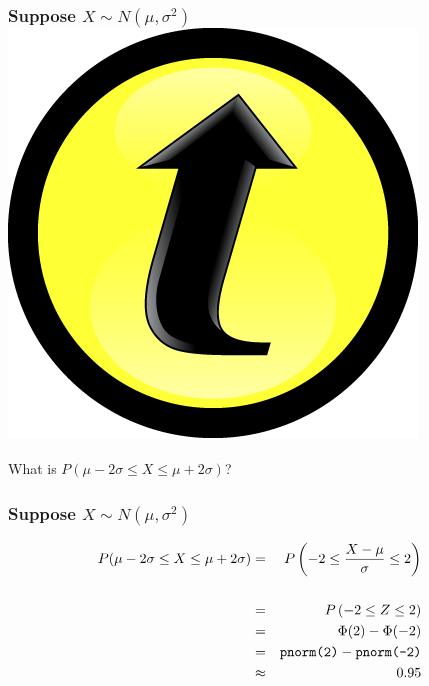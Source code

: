\documentclass[handout]{beamer}
\begin{document}

\begin{frame}
\frametitle{Suppose $X \sim N(\mu, \sigma^2)$\hfill \includegraphics[scale = 0.05]{./images/clicker}}
What is $P(\mu - 2\sigma \leq X \leq \mu + 2\sigma)$?
\end{frame}

\begin{frame}
\frametitle{Suppose $X \sim N(\mu, \sigma^2)$}

\begin{eqnarray*}
P(\mu - 2\sigma \leq X \leq \mu + 2\sigma) &=& P\left( -2 \leq \frac{X-\mu}{\sigma} \leq 2\right)\\ \\
	&=& P\left( -2 \leq Z \leq 2\right)\\
	&=& \Phi(2) - \Phi(-2)\\
	&=& \mbox{\texttt{pnorm(2)}} -  \mbox{\texttt{pnorm(-2)}}\\
	&\approx& 0.95
\end{eqnarray*}
\end{frame}


\end{document}
